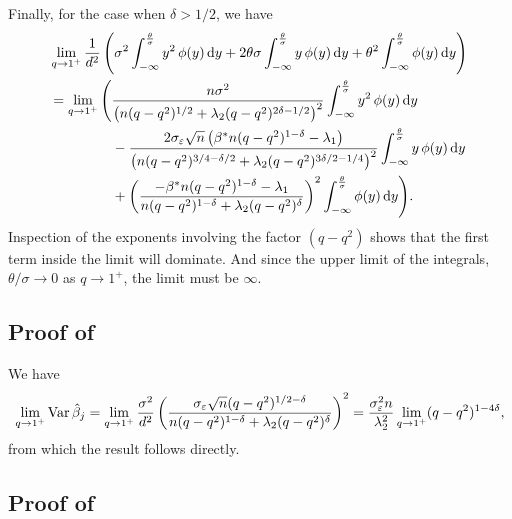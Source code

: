 Finally, for the case when \(\delta > 1/2\), we have
\begin{multline*}
  \lim_{q \rightarrow 1^+} \frac{1}{d^2} \left(\sigma^2 \int_{-\infty}^\frac{\theta}{\sigma} y^2 \operatorname{\phi}(y) \mathop{}\!\mathrm{d} y + 2 \theta \sigma \int_{-\infty}^\frac{\theta}{\sigma} y \operatorname{\phi}(y) \mathop{}\!\mathrm{d} y + \theta^2 \int_{-\infty}^\frac{\theta}{\sigma} \operatorname{\phi}(y) \mathop{}\!\mathrm{d} y\right) \\
  \begin{aligned}
    = \lim_{q \rightarrow 1^+} \Bigg( & \frac{n \sigma^2}{ \left(n (q-q^2)^{1/2} + \lambda_2(q-q^2)^{2\delta - 1/2}\right)^2} \int_{-\infty}^\frac{\theta}{\sigma} y^2 \operatorname{\phi}(y) \mathop{}\!\mathrm{d} y                                                                                        \\
                                      & - \frac{2\sigma_\varepsilon \sqrt{n}\left(\beta^* n (q- q^2)^{1 - \delta} - \lambda_1\right)}{\left(n(q-q^2)^{3/4 - \delta/2} + \lambda_2(q-q^2)^{3\delta / 2 - 1/4}\right)^2} \int_{-\infty}^\frac{\theta}{\sigma} y \operatorname{\phi}(y) \mathop{}\!\mathrm{d} y \\
                                      & + \left(\frac{-\beta^*n(q-q^2)^{1-\delta} - \lambda_1}{n(q-q^2)^{1-\delta} + \lambda_2(q-q^2)^\delta}\right)^2 \int_{-\infty}^\frac{\theta}{\sigma} \operatorname{\phi}(y) \mathop{}\!\mathrm{d} y\Bigg).
  \end{aligned}
\end{multline*}
Inspection of the exponents involving the factor \((q - q^2)\) shows that the first term inside the limit will dominate. And since the upper limit of the integrals, \(\theta/\sigma \rightarrow  0\)  as \(q \rightarrow 1^+\), the limit must be \(\infty\).

\subsection{Proof of }

We have
\begin{equation*}
  \lim_{q\rightarrow 1^+}\operatorname{Var} \hat{\beta}_j = \lim_{q \rightarrow 1^+}\frac{\sigma^2}{d^2} \left(\frac{\sigma_\varepsilon \sqrt{n} (q - q^2)^{1/2 - \delta}}{n (q-q^2)^{1 - \delta} + \lambda_2 (q-q^2)^\delta}\right)^2
  = \frac{\sigma_\varepsilon^2 n}{\lambda_2^2} \lim_{q \rightarrow 1^+}(q-q^2)^{1 - 4\delta},
\end{equation*}
from which the result follows directly.

\subsection{Proof of }

